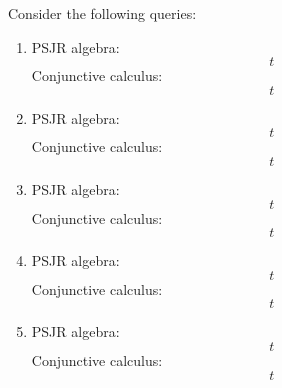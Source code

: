 \documentclass{../../cs-classes/cs-classes}
\begin{document}
\begin{exercise}
    Consider the following queries:
  \begin{enumerate}
    \item PSJR algebra:
    \begin{equation}
        t
    \end{equation}
    Conjunctive calculus:
    \begin{equation}
        t
    \end{equation}
    
    \item PSJR algebra:
    \begin{equation}
        t
    \end{equation}
    Conjunctive calculus:
    \begin{equation}
        t
    \end{equation}
    
    \item PSJR algebra:
    \begin{equation}
        t
    \end{equation}
    Conjunctive calculus:
    \begin{equation}
        t
    \end{equation}
    
    \item PSJR algebra:
    \begin{equation}
        t
    \end{equation}
    Conjunctive calculus:
    \begin{equation}
        t
    \end{equation}
    
    \item PSJR algebra:
    \begin{equation}
        t
    \end{equation}
    Conjunctive calculus:
    \begin{equation}
        t
    \end{equation}

  \end{enumerate}  
\end{exercise}
\end{document}
